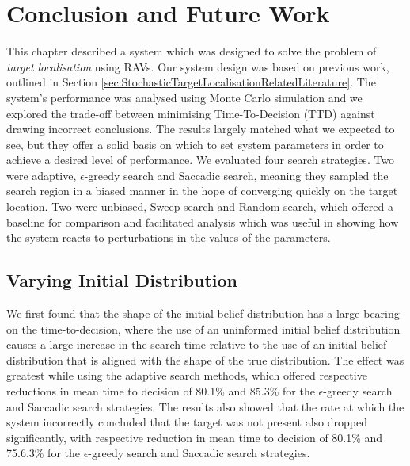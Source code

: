 \section{Conclusion and Future Work}


This chapter described a system which was designed to solve the problem of \textit{target localisation} using RAVs. Our system design was based on previous work, outlined in Section \ref{sec:StochasticTargetLocalisationRelatedLiterature}. The system's performance was analysed using Monte Carlo simulation and we explored the trade-off between minimising Time-To-Decision (TTD) against drawing incorrect conclusions. The results largely matched what we expected to see, but they offer a solid basis on which to set system parameters in order to achieve a desired level of performance. We evaluated four search strategies. Two were adaptive, $\epsilon$-greedy search and Saccadic search, meaning they sampled the search region in a biased manner in the hope of converging quickly on the target location. Two were unbiased, Sweep search and Random search, which offered a baseline for comparison and facilitated analysis which was useful in showing how the system reacts to perturbations in the values of the parameters.

\subsection{Varying Initial Distribution}
We first found that the shape of the initial belief distribution has a large bearing on the time-to-decision, where the use of an uninformed initial belief distribution causes a large increase in the search time relative to the use of an initial belief distribution that is aligned with the shape of the true distribution. The effect was greatest while using the adaptive search methods, which offered respective reductions in mean time to decision of 80.1\% and 85.3\% for the $\epsilon$-greedy search and Saccadic search strategies. The results also showed that the rate at which the system incorrectly concluded that the target was not present also dropped significantly, with respective reduction in mean time to decision of 80.1\% and 75.6.3\% for the $\epsilon$-greedy search and Saccadic search strategies. \par

